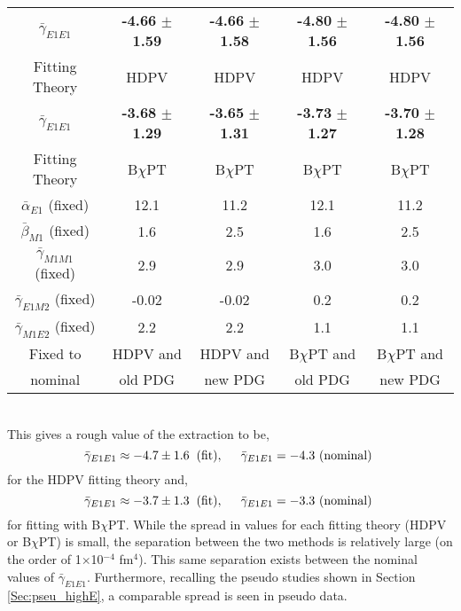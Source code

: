 \documentclass[]{article}
\begin{document}
\begin{table}[h!]
	\centering %
	\begin{tabular}{|c|c|c|c|c|} %
		\hline %
		$\bar{\gamma}_{E1E1}$ & \textbf{-4.66} $\pm$ \textbf{1.59}  & \textbf{-4.66} $\pm$ \textbf{1.58} & \textbf{-4.80} $\pm$ \textbf{1.56} & \textbf{-4.80} $\pm$ \textbf{1.56}\\ [0.5ex]
		Fitting Theory & HDPV &  HDPV & HDPV & HDPV \\[0.5ex]		
		\hline
		\hline %
		$\bar{\gamma}_{E1E1}$ & \textbf{-3.68} $\pm$ \textbf{1.29}  & \textbf{-3.65} $\pm$ \textbf{1.31} & \textbf{-3.73} $\pm$ \textbf{1.27} & \textbf{-3.70} $\pm$ \textbf{1.28}\\ [0.5ex]
		Fitting Theory & B$\chi$PT &  B$\chi$PT & B$\chi$PT & B$\chi$PT\\[0.5ex]
		\hline
		\hline		
		$\bar{\alpha}_{E1}$   (fixed) & 12.1 & 11.2 & 12.1 & 11.2 \\
		$\bar{\beta}_{M1}$   (fixed) & 1.6 & 2.5 & 1.6 & 2.5\\
		\hline
		$\bar{\gamma}_{M1M1}$ (fixed) & 2.9   & 2.9  & 3.0  & 3.0 \\
		$\bar{\gamma}_{E1M2}$ (fixed) & -0.02 & -0.02 & 0.2 & 0.2  \\
		$\bar{\gamma}_{M1E2}$ (fixed) & 2.2 & 2.2 & 1.1 & 1.1 \\	[0.5ex]
		\hline
		Fixed to & HDPV and & HDPV and & B$\chi$PT and & B$\chi$PT and \\
		nominal  & old PDG & new PDG & old PDG & new PDG \\
		\hline
	\end{tabular}
\end{table}

\noindent \\ This gives a rough value of the extraction to be,
\begin{equation}
\bar{\gamma}_{E1E1} \approx -4.7 \pm 1.6 \hspace{2mm} \text{(fit)}, \hspace{5mm} \bar{\gamma}_{E1E1} = -4.3 \text{ (nominal) }
\end{equation}
for the HDPV fitting theory and,
\begin{equation}
\bar{\gamma}_{E1E1} \approx -3.7 \pm 1.3 \hspace{2mm} \text{(fit)}, \hspace{5mm} \bar{\gamma}_{E1E1} = -3.3 \text{ (nominal) }
\end{equation}
for fitting with B$\chi$PT. While the spread in values for each fitting theory (HDPV or B$\chi$PT) is small, the separation between the two methods is relatively large (on the order of 1$\times$10$^{-4}$ fm$^{4}$). This same separation exists between the nominal values of $\bar{\gamma}_{E1E1}$. Furthermore, recalling the pseudo studies shown in Section \ref{Sec:pseu_highE}, a comparable spread is seen in pseudo data. 
\end{document}
